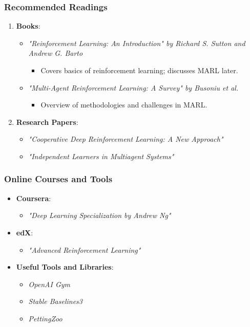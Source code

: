 \documentclass[aspectratio=169]{beamer}
\begin{document}
\begin{frame}
    \frametitle{Recommended Readings}
    \begin{enumerate}
        \item \textbf{Books}:
        \begin{itemize}
            \item \textit{"Reinforcement Learning: An Introduction" by Richard S. Sutton and Andrew G. Barto}
            \begin{itemize}
                \item Covers basics of reinforcement learning; discusses MARL later.
            \end{itemize}
            \item \textit{"Multi-Agent Reinforcement Learning: A Survey" by Busoniu et al.}
            \begin{itemize}
                \item Overview of methodologies and challenges in MARL.
            \end{itemize}
        \end{itemize}
        
        \item \textbf{Research Papers}:
        \begin{itemize}
            \item \textit{"Cooperative Deep Reinforcement Learning: A New Approach"}
            \item \textit{"Independent Learners in Multiagent Systems"}
        \end{itemize}
    \end{enumerate}
\end{frame}

\begin{frame}
    \frametitle{Online Courses and Tools}
    \begin{itemize}
        \item \textbf{Coursera}: 
        \begin{itemize}
            \item \textit{"Deep Learning Specialization by Andrew Ng"}
        \end{itemize}
        
        \item \textbf{edX}:
        \begin{itemize}
            \item \textit{"Advanced Reinforcement Learning"}
        \end{itemize}

        \item \textbf{Useful Tools and Libraries}:
        \begin{itemize}
            \item \textit{OpenAI Gym}
            \item \textit{Stable Baselines3}
            \item \textit{PettingZoo}
        \end{itemize}
    \end{itemize}
\end{frame}
\end{document}
